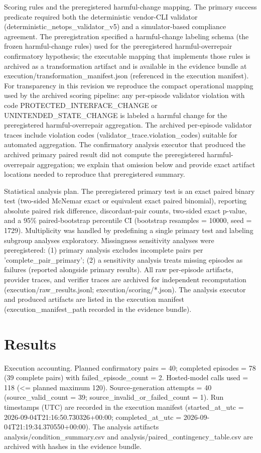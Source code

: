 \documentclass[conference]{IEEEtran}
\begin{document}
Scoring rules and the preregistered harmful-change mapping. The primary success predicate required both the deterministic vendor-CLI validator (deterministic\_netops\_validator\_v5) and a simulator-based compliance agreement. The preregistration specified a harmful-change labeling schema (the frozen harmful-change rules) used for the preregistered harmful-overrepair confirmatory hypothesis; the executable mapping that implements those rules is archived as a transformation artifact and is available in the evidence bundle at execution/transformation\_manifest.json (referenced in the execution manifest). For transparency in this revision we reproduce the compact operational mapping used by the archived scoring pipeline: any per-episode validator violation with code PROTECTED\_INTERFACE\_CHANGE or UNINTENDED\_STATE\_CHANGE is labeled a harmful change for the preregistered harmful-overrepair aggregation. The archived per-episode validator traces include violation codes (validator\_trace.violation\_codes) suitable for automated aggregation. The confirmatory analysis executor that produced the archived primary paired result did not compute the preregistered harmful-overrepair aggregation; we explain that omission below and provide exact artifact locations needed to reproduce that preregistered summary.

Statistical analysis plan. The preregistered primary test is an exact paired binary test (two-sided McNemar exact or equivalent exact paired binomial), reporting absolute paired risk difference, discordant-pair counts, two-sided exact p-value, and a 95\% paired-bootstrap percentile CI (bootstrap resamples = 10000, seed = 1729). Multiplicity was handled by predefining a single primary test and labeling subgroup analyses exploratory. Missingness sensitivity analyses were preregistered: (1) primary analysis excludes incomplete pairs per 'complete\_pair\_primary'; (2) a sensitivity analysis treats missing episodes as failures (reported alongside primary results). All raw per-episode artifacts, provider traces, and verifier traces are archived for independent recomputation (execution/raw\_results.jsonl; execution/scoring/*.json). The analysis executor and produced artifacts are listed in the execution manifest (execution\_manifest\_path recorded in the evidence bundle).

\section{Results}
Execution accounting. Planned confirmatory pairs = 40; completed episodes = 78 (39 complete pairs) with failed\_episode\_count = 2. Hosted-model calls used = 118 (<= planned maximum 120). Source-generation attempts = 40 (source\_valid\_count = 39; source\_invalid\_or\_failed\_count = 1). Run timestamps (UTC) are recorded in the execution manifest (started\_at\_utc = 2026-09-04T21:16:50.730326+00:00; completed\_at\_utc = 2026-09-04T21:19:34.370550+00:00). The analysis artifacts analysis/condition\_summary.csv and analysis/paired\_contingency\_table.csv are archived with hashes in the evidence bundle.
\end{document}
